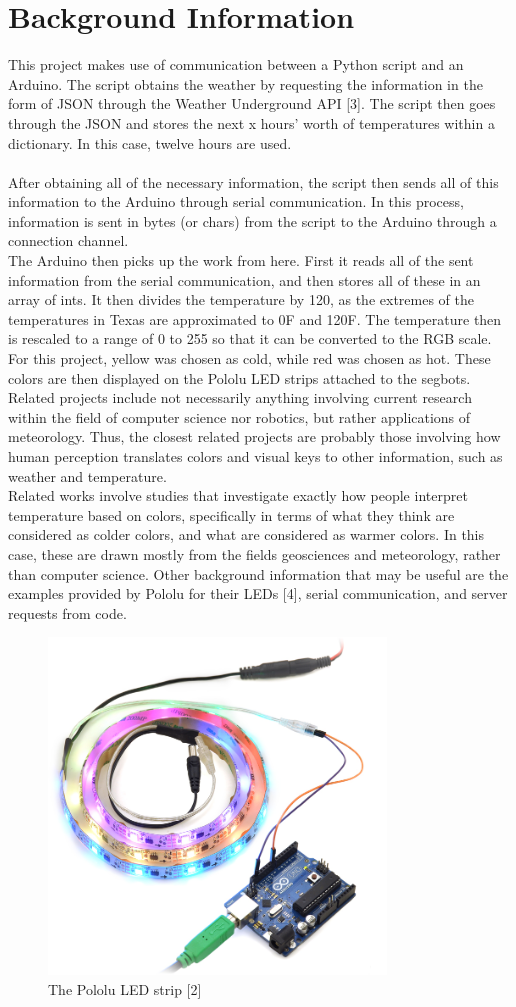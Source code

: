 \documentclass[12pt]{article}
\begin{document}
\section{Background Information}
This project makes use of communication between a Python script and an Arduino. The script obtains the weather by requesting the information in the form of JSON through the Weather Underground API [3]. The script then goes through the JSON and stores the next x hours' worth of temperatures within a dictionary. In this case, twelve hours are used. \\\\ After obtaining all of the necessary information, the script then sends all of this information to the Arduino through serial communication. In this process, information is sent in bytes (or chars) from the script to the Arduino through a connection channel.\\
\indent The Arduino then picks up the work from here. First it reads all of the sent information from the serial communication, and then stores all of these in an array of ints. It then divides the temperature by 120, as the extremes of the temperatures in Texas are approximated to 0{\degree}F and 120{\degree}F. The temperature then is rescaled to a range of 0 to 255 so that it can be converted to the RGB scale. For this project, yellow was chosen as cold, while red was chosen as hot. These colors are then displayed on the Pololu LED strips attached to the segbots. Related projects include not necessarily anything involving current research within the field of computer science nor robotics, but rather applications of meteorology. Thus, the closest related projects are probably those involving how human perception translates colors and visual keys to other information, such as weather and temperature.\\
\indent Related works involve studies that investigate exactly how people interpret temperature based on colors, specifically in terms of what they think are considered as colder colors, and what are considered as warmer colors. In this case, these are drawn mostly from the fields geosciences and meteorology, rather than computer science. Other background information that may be useful are the examples provided by Pololu for their LEDs [4], serial communication, and server requests from code.


\begin{figure}[ht]
\centering
\includegraphics[height=0.4\textwidth, width=0.8\textwidth]{Pololu.jpg}
\caption{The Pololu LED strip [2]}
\vspace{-1em}
\end{figure}
\end{document}
